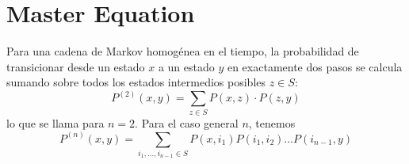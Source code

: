 \section{Master Equation}
\begin{definicion}
    Para una cadena de Markov homogénea en el tiempo, la probabilidad de transicionar desde un estado $x$ a un estado $y$ en exactamente dos pasos se calcula sumando sobre todos los estados intermedios posibles $z \in S$:
    \begin{equation*}
        P^{(2)}(x, y) = \sum_{z \in S} P(x, z) \cdot P(z, y)
    \end{equation*}
    lo que se llama  para $n=2$. Para el caso general $n$, tenemos 
    \begin{equation*}
        P^{(n)}(x,y) = \sum_{i_1, \dots, i_{n-1} \in S} P(x, i_1) P(i_1, i_2) \dots P(i_{n-1}, y)
    \end{equation*}
\end{definicion}

